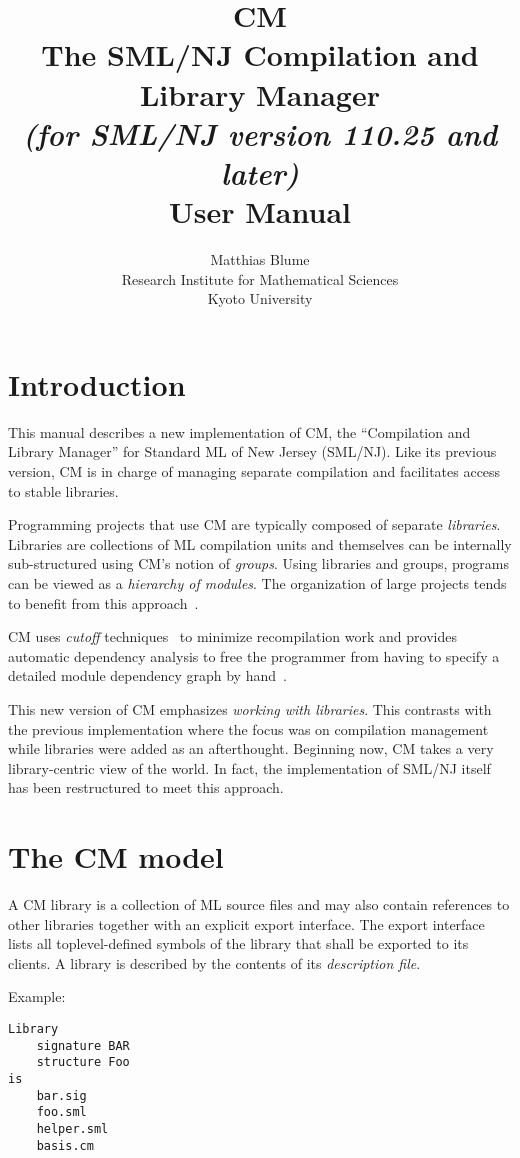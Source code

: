 \documentclass{article}
\author{Matthias Blume \\
Research Institute for Mathematical Sciences \\
Kyoto University}
\title{{\bf CM}\\
The SML/NJ Compilation and Library Manager \\
{\it\small (for SML/NJ version 110.25 and later)} \\
User Manual}
\begin{document}


\maketitle

\section{Introduction}

This manual describes a new implementation of CM, the ``Compilation
and Library Manager'' for Standard ML of New Jersey (SML/NJ).  Like its
previous version, CM is in charge of managing separate compilation and
facilitates access to stable libraries.

Programming projects that use CM are typically composed of separate
{\em libraries}.  Libraries are collections of ML compilation units
and themselves can be internally sub-structured using CM's notion of
{\em groups}.  Using libraries and groups, programs can be viewed as a
{\em hierarchy of modules}.  The organization of large projects tends
to benefit from this approach~\cite{blume:appel:cm99}.

CM uses {\em cutoff} techniques~\cite{tichy94} to minimize
recompilation work and provides automatic dependency analysis to free
the programmer from having to specify a detailed module dependency
graph by hand~\cite{blume:depend99}.

This new version of CM emphasizes {\em working with libraries}.  This
contrasts with the previous implementation where the focus was on
compilation management while libraries were added as an afterthought.
Beginning now, CM takes a very library-centric view of the world.  In
fact, the implementation of SML/NJ itself has been restructured to
meet this approach.

\section{The CM model}

A CM library is a collection of ML source files and may also contain
references to other libraries together with an explicit export
interface.  The export interface lists all toplevel-defined symbols of
the library that shall be exported to its clients.  A library is
described by the contents of its {\em description file}.

\noindent Example:

\begin{verbatim}
Library
    signature BAR
    structure Foo
is
    bar.sig
    foo.sml
    helper.sml
    basis.cm
\end{verbatim}
\end{document}
